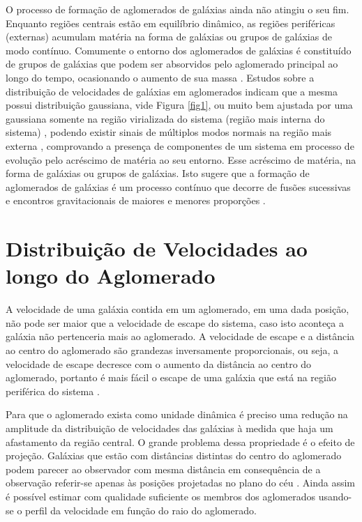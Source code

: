 O processo de formação de aglomerados de galáxias ainda não atingiu o seu fim. Enquanto regiões centrais estão em equilíbrio dinâmico, as regiões periféricas (externas) acumulam matéria na forma de galáxias ou grupos de galáxias de modo contínuo. Comumente o entorno dos aglomerados de galáxias é constituído de grupos de galáxias que podem ser absorvidos pelo aglomerado principal ao longo do tempo, ocasionando o aumento de sua massa \cite{rembold2011}. Estudos sobre a distribuição de velocidades de galáxias em aglomerados indicam que a mesma possui distribuição gaussiana, vide Figura \ref{fig1}, ou muito bem ajustada por uma gaussiana somente na região virializada do sistema (região mais interna do sistema) \cite{yahil1977velocity}, podendo existir sinais de múltiplos modos normais na região mais externa \cite{ribeiro2011non}, comprovando a presença de componentes de um sistema em processo de evolução pelo acréscimo de matéria ao seu entorno. Esse acréscimo de matéria, na forma de galáxias ou grupos de galáxias.  Isto sugere que a formação de aglomerados de galáxias é um processo contínuo que decorre de fusões sucessivas e encontros gravitacionais de maiores e menores proporções \cite{nascimento2016dynamical}.


\section{Distribuição de Velocidades ao longo do Aglomerado}
A velocidade de uma galáxia contida em um aglomerado, em uma dada posição, não pode ser maior que a velocidade de escape do sistema, caso isto aconteça a galáxia não pertenceria mais ao aglomerado. A velocidade de escape e a distância ao centro do aglomerado são grandezas inversamente proporcionais, ou seja, a velocidade de escape decresce com o aumento da distância ao centro do aglomerado, portanto é mais fácil o escape de uma galáxia que está na região periférica do sistema \cite{viegas2004}.

Para que o aglomerado exista como unidade dinâmica é preciso uma redução na amplitude da distribuição de velocidades das galáxias à medida que haja um afastamento da região central. O grande problema dessa propriedade é o efeito de projeção. Galáxias que estão com distâncias distintas do centro do aglomerado podem parecer ao observador com mesma distância em consequência de a observação referir-se apenas às posições projetadas no plano do céu \cite{viegas2004}. Ainda assim é possível estimar com qualidade suficiente os membros dos aglomerados usando-se o perfil da velocidade 
em função do raio do aglomerado.

